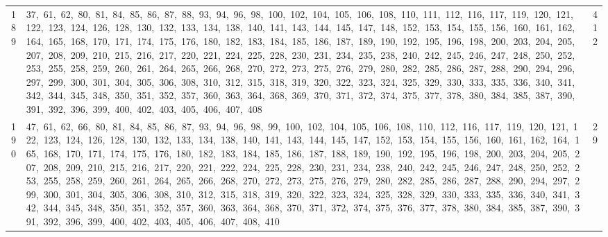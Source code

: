 \begin{longtable}{c|p{}|r}
189 & 37,\ 61,\ 62,\ 80,\ 81,\ 84,\ 85,\ 86,\ 87,\ 88,\ 93,\ 94,\ 96,\ 98,\ 100,\ 102,\ 104,\ 105,\ 106,\ 108,\ 110,\ 111,\ 112,\ 116,\ 117,\ 119,\ 120,\ 121,\ 122,\ 123,\ 124,\ 126,\ 128,\ 130,\ 132,\ 133,\ 134,\ 138,\ 140,\ 141,\ 143,\ 144,\ 145,\ 147,\ 148,\ 152,\ 153,\ 154,\ 155,\ 156,\ 160,\ 161,\ 162,\ 164,\ 165,\ 168,\ 170,\ 171,\ 174,\ 175,\ 176,\ 180,\ 182,\ 183,\ 184,\ 185,\ 186,\ 187,\ 189,\ 190,\ 192,\ 195,\ 196,\ 198,\ 200,\ 203,\ 204,\ 205,\ 207,\ 208,\ 209,\ 210,\ 215,\ 216,\ 217,\ 220,\ 221,\ 224,\ 225,\ 228,\ 230,\ 231,\ 234,\ 235,\ 238,\ 240,\ 242,\ 245,\ 246,\ 247,\ 248,\ 250,\ 252,\ 253,\ 255,\ 258,\ 259,\ 260,\ 261,\ 264,\ 265,\ 266,\ 268,\ 270,\ 272,\ 273,\ 275,\ 276,\ 279,\ 280,\ 282,\ 285,\ 286,\ 287,\ 288,\ 290,\ 294,\ 296,\ 297,\ 299,\ 300,\ 301,\ 304,\ 305,\ 306,\ 308,\ 310,\ 312,\ 315,\ 318,\ 319,\ 320,\ 322,\ 323,\ 324,\ 325,\ 329,\ 330,\ 333,\ 335,\ 336,\ 340,\ 341,\ 342,\ 344,\ 345,\ 348,\ 350,\ 351,\ 352,\ 357,\ 360,\ 363,\ 364,\ 368,\ 369,\ 370,\ 371,\ 372,\ 374,\ 375,\ 377,\ 378,\ 380,\ 384,\ 385,\ 387,\ 390,\ 391,\ 392,\ 396,\ 399,\ 400,\ 402,\ 403,\ 405,\ 406,\ 407,\ 408 & 412 \\
190 & 47,\ 61,\ 62,\ 66,\ 80,\ 81,\ 84,\ 85,\ 86,\ 87,\ 93,\ 94,\ 96,\ 98,\ 99,\ 100,\ 102,\ 104,\ 105,\ 106,\ 108,\ 110,\ 112,\ 116,\ 117,\ 119,\ 120,\ 121,\ 122,\ 123,\ 124,\ 126,\ 128,\ 130,\ 132,\ 133,\ 134,\ 138,\ 140,\ 141,\ 143,\ 144,\ 145,\ 147,\ 152,\ 153,\ 154,\ 155,\ 156,\ 160,\ 161,\ 162,\ 164,\ 165,\ 168,\ 170,\ 171,\ 174,\ 175,\ 176,\ 180,\ 182,\ 183,\ 184,\ 185,\ 186,\ 187,\ 188,\ 189,\ 190,\ 192,\ 195,\ 196,\ 198,\ 200,\ 203,\ 204,\ 205,\ 207,\ 208,\ 209,\ 210,\ 215,\ 216,\ 217,\ 220,\ 221,\ 222,\ 224,\ 225,\ 228,\ 230,\ 231,\ 234,\ 238,\ 240,\ 242,\ 245,\ 246,\ 247,\ 248,\ 250,\ 252,\ 253,\ 255,\ 258,\ 259,\ 260,\ 261,\ 264,\ 265,\ 266,\ 268,\ 270,\ 272,\ 273,\ 275,\ 276,\ 279,\ 280,\ 282,\ 285,\ 286,\ 287,\ 288,\ 290,\ 294,\ 297,\ 299,\ 300,\ 301,\ 304,\ 305,\ 306,\ 308,\ 310,\ 312,\ 315,\ 318,\ 319,\ 320,\ 322,\ 323,\ 324,\ 325,\ 328,\ 329,\ 330,\ 333,\ 335,\ 336,\ 340,\ 341,\ 342,\ 344,\ 345,\ 348,\ 350,\ 351,\ 352,\ 357,\ 360,\ 363,\ 364,\ 368,\ 370,\ 371,\ 372,\ 374,\ 375,\ 376,\ 377,\ 378,\ 380,\ 384,\ 385,\ 387,\ 390,\ 391,\ 392,\ 396,\ 399,\ 400,\ 402,\ 403,\ 405,\ 406,\ 407,\ 408,\ 410 & 29 \\

\end{longtable}
